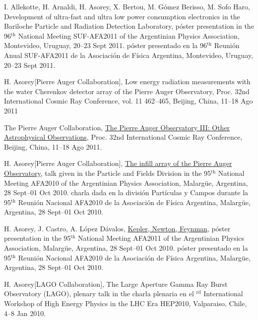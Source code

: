 \begin{etaremune}
\item {}I. Allekotte, H. Arnaldi, H. Asorey, X. Bertou, M. Gómez Berisso,
M. Sofo Haro, {{Development of ultra-fast and ultra low power consumption
electronics in the Bariloche Particle and Radiation Detection Laboratory}},
\ifeng
póster presentation in the 96$^{\mathrm{th}}$ National Meeting SUF-AFA2011 of the Argentinian Physics Association, Montevideo, Uruguay, 20--23 Sept 2011.
\else
póster presentado en la 96$^{\mathrm{th}}$ Reunión Anual SUF-AFA2011 de la Asociación de Física Argentina, Montevideo, Uruguay, 20--23 Sept 2011.
\fi

\item {}H. Asorey[Pierre Auger Collaboration], {{Low energy radiation
measurements with the water Cherenkov detector array of the Pierre Auger
Observatory}}, \en Proc.
32nd International Cosmic Ray Conference, vol.
11
462--465, Beijing, China, 11--18 Ago 2011

\item {}The Pierre Auger Collaboration,
\href{http://arxiv.org/abs/1107.4805}{{The Pierre Auger Observatory III:
Other Astrophysical Observations}}, \en Proc.
32nd International Cosmic Ray
Conference, Beijing, China, 11--18 Ago 2011.

\item {}H. Asorey[Pierre Auger Collaboration],
\href{http://95rnf.afa.webfactional.com/tex\_files/Resumenes/DPyC/PyC\_6.pdf}{{The
infill array of the Pierre Auger Observatory}}, 
\ifeng
talk given in the Particle and Fields Division in the 95$^{\mathrm{th}}$ National Meeting AFA2010 of the Argentinian Physics Association, Malargüe, Argentina, 28 Sept--01 Oct 2010.
\else
charla dada en la división Partículas y Campos durante la 95$^{\mathrm{th}}$ Reunión Nacional AFA2010 de la Asociación de Física Argentina, Malargüe, Argentina, 28 Sept--01 Oct 2010.
\fi

\item {}H. Asorey, J. Castro, A. López Dávalos,
\href{http://95rnf.afa.webfactional.com/tex\_files/Resumenes/EF/asorey.pdf}{{Kepler,
Newton, Feynman}}, 
\ifeng
póster presentation in the 95$^{\mathrm{th}}$ National Meeting AFA2011 of the Argentinian Physics Association, Malargüe, Argentina, 28 Sept--01 Oct 2010.
\else
póster presentado en la 95$^{\mathrm{th}}$ Reunión Nacional AFA2010 de la Asociación de Física Argentina, Malargüe, Argentina, 28 Sept--01 Oct 2010.
\fi

\item {}H. Asorey[LAGO Collaboration], {{The Large Aperture Gamma Ray Burst Observatory (LAGO)}}, 
\ifeng
plenary talk in the 
\else
charla plenaria en el 
$^{\mathrm{rd}}$ International Workshop of High Energy Physics in the LHC Era HEP2010, Valparaiso, Chile, 4--8 Jan 2010.


\end{etaremune}

